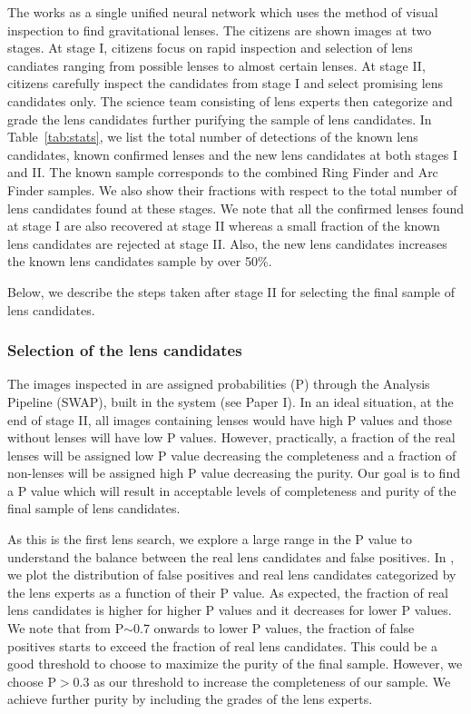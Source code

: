 \documentclass[useAMS,usenatbib,a4paper]{mn2e}
\begin{document}
The \sw works as a single unified neural network which uses the method
of visual inspection to find gravitational lenses. The citizens are
shown images at two stages. At stage I, citizens focus on rapid
inspection and selection of lens candiates ranging from possible lenses
to almost certain lenses. At stage II, citizens carefully inspect the
candidates from stage I and select promising lens candidates only. The
science team consisting of lens experts then categorize and grade the
lens candidates further purifying the sample of lens candidates. In
Table~\ref{tab:stats}, we list the total number of detections of the
known lens candidates, known confirmed lenses and the new lens
candidates at both stages I and II. The known sample corresponds to the
combined Ring Finder and Arc Finder samples. We also show their
fractions with respect to the total number of lens candidates found at
these stages. We note that all the confirmed lenses found at stage I are
also recovered at stage II whereas a small fraction of the known lens
candidates are rejected at stage II. Also, the new lens candidates
increases the known lens candidates sample by over 50\%.

Below, we describe the steps taken after stage II for selecting the
final sample of lens candidates.

\subsubsection{Selection of the \sw lens candidates}
\label{sec:results:stage1}
The images inspected in \sw are assigned probabilities (P) through the
\sw Analysis Pipeline (SWAP), built in the \sw system (see Paper I).
In an ideal situation, at the end of stage II, all images containing
lenses would have high P values and those without lenses will have low P
values. However, practically, a fraction of the real lenses will be
assigned low P value decreasing the completeness and a fraction of non-lenses
will be assigned high P value decreasing the purity. Our goal is to find
a P value which will result in acceptable levels of completeness and
purity of the final sample of lens candidates.  

As this is the first \sw lens search, we explore a large range in the P
value to understand the balance between the real lens candidates and
false positives. In , we plot the distribution of
false positives and real lens candidates categorized by the lens experts
as a function of their P value. As expected, the fraction of real lens
candidates is higher for higher P values and it decreases for lower P
values. We note that from P$\sim$0.7 onwards to lower P values, the fraction of
false positives starts to exceed the fraction of real lens candidates.
This could be a good threshold to choose to maximize the purity of the final
sample. However, we choose P$>$0.3 as our threshold to increase the
completeness of our sample. We achieve further purity by including the
grades of the lens experts.
\end{document}
